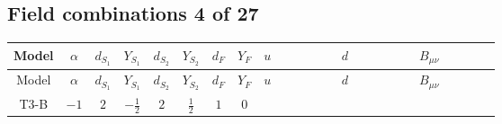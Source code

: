 \documentclass[8pt]{article}
\begin{document}
\begin{landscape}
\subsection*{Field combinations 4 of 27}
\begin{longtable}{@{}cccccccc >{\raggedright\arraybackslash}p{0.21\linewidth} >{\raggedright\arraybackslash}p{0.21\linewidth} >{\raggedright\arraybackslash}p{0.21\linewidth}@{}}
\toprule
Model & $\alpha$ & $d_{S_1}$ & $Y_{S_1}$ & $d_{S_2}$ & $Y_{S_2}$ & $d_F$ & $Y_F$ & $u$ & $d$ & $B_{\mu\nu}$ \\
\midrule
\endfirsthead
\toprule
Model & $\alpha$ & $d_{S_1}$ & $Y_{S_1}$ & $d_{S_2}$ & $Y_{S_2}$ & $d_F$ & $Y_F$ & $u$ & $d$ & $B_{\mu\nu}$ \\
\midrule
\endhead
T3-B & $-1$ & $2$ & $-\frac{1}{2}$ & $2$ & $\frac{1}{2}$ & $1$ & $0$ & \scriptsize\adjustbox{max width=\linewidth}{$\begin{gathered} -\frac{\hbar  \overline{u_{\alpha _1,i_3}}\, \gamma ^{\mu _1}\, P_R\, u_{\alpha _1,i_3} \overline{u_{\alpha _2,i_4}}\, \gamma ^{\mu _1}\, P_R\, u_{\alpha _2,i_4} g_1^4}{270 m_1^2}\end{gathered}$} & \scriptsize\adjustbox{max width=\linewidth}{$\begin{gathered} -\frac{\hbar  \overline{d_{\alpha _1,i_3}}\, \gamma ^{\mu _1}\, P_R\, d_{\alpha _1,i_3} \overline{d_{\alpha _2,i_4}}\, \gamma ^{\mu _1}\, P_R\, d_{\alpha _2,i_4} g_1^4}{1080 m_1^2}\end{gathered}$} & \scriptsize\adjustbox{max width=\linewidth}{$\begin{gathered} -\frac{\hbar  B_{\mu _1\mu _2}^2}{24 \epsilon } \\ -\frac{1}{24} \hbar  \log \left(\frac{\bar{\mu}^{2}}{m_1^2}\right) B_{\mu _1\mu _2}^2\end{gathered}$} \\
\midrule
\bottomrule
\end{longtable}
\clearpage

\end{landscape}
\end{document}
